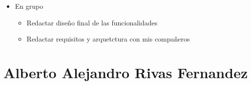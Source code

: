 \begin{itemize}
\begin{itemize}
\begin{itemize}
                    \end{itemize}
              \item En grupo
                    \begin{itemize}
                        \item Redactar diseño final de las funcionalidades
                        \item Redactar requisitos y arquetctura con mis compañeros



                    \end{itemize}
          \end{itemize}
\end{itemize}

\section{Alberto Alejandro Rivas Fernandez}
